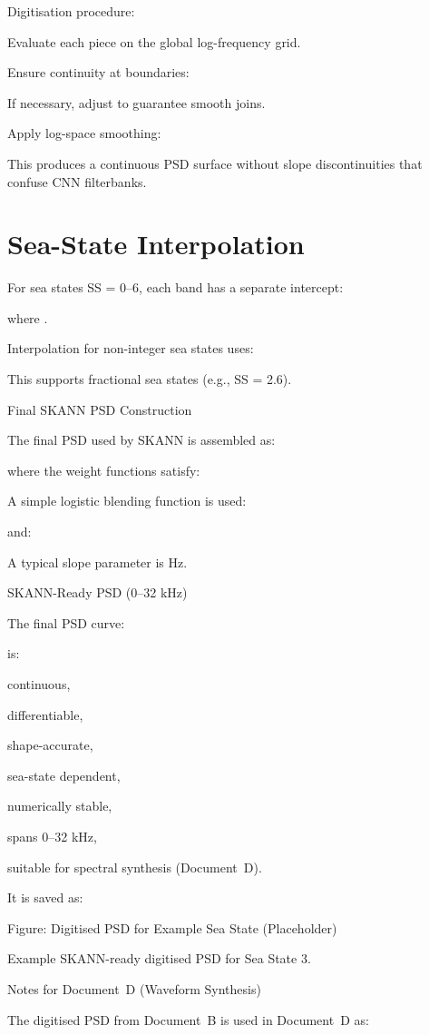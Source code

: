 \documentclass[12pt]{article}
\begin{document}
Digitisation procedure:

Evaluate each piece on the global log-frequency grid.

Ensure continuity at boundaries:



If necessary, adjust  to guarantee smooth joins.

Apply log-space smoothing:


This produces a continuous PSD surface without slope discontinuities that confuse CNN filterbanks.

\section*{Sea-State Interpolation}
For sea states SS = 0–6, each band has a separate intercept:


where .

Interpolation for non-integer sea states uses:


This supports fractional sea states (e.g., SS = 2.6).

Final SKANN PSD Construction

The final PSD used by SKANN is assembled as:


where the weight functions satisfy:




A simple logistic blending function is used:



and:


A typical slope parameter is  Hz.

SKANN-Ready PSD (0–32 kHz)

The final PSD curve:


is:

continuous,

differentiable,

shape-accurate,

sea-state dependent,

numerically stable,

spans 0–32 kHz,

suitable for spectral synthesis (Document D).

It is saved as:


Figure: Digitised PSD for Example Sea State (Placeholder)

Example SKANN-ready digitised PSD for Sea State 3.

Notes for Document D (Waveform Synthesis)

The digitised PSD from Document B is used in Document D as:
\end{document}
